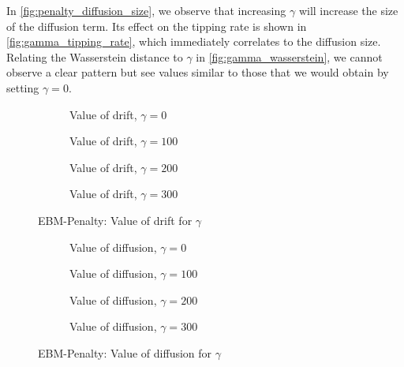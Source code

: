 \documentclass[twoside,11pt]{article}
\begin{document}
In \cref{fig:penalty_diffusion_size}, we observe that increasing \(\gamma\) will increase the size of the diffusion term. Its effect on the tipping rate is shown in \cref{fig:gamma_tipping_rate}, which immediately correlates to the diffusion size. Relating the Wasserstein distance to \(\gamma\) in \cref{fig:gamma_wasserstein}, we cannot observe a clear pattern but see values similar to those that we would obtain by setting \(\gamma=0\).

\begin{figure}
    \begin{subfigure}{.5\textwidth}
        \centering
        
        \caption{Value of drift, \(\gamma=0\)}
    \end{subfigure}
    \begin{subfigure}{.5\textwidth}
        \centering
        
        \caption{Value of drift, \(\gamma=100\)}
    \end{subfigure}
    \begin{subfigure}{.5\textwidth}
        \centering
        
        \caption{Value of drift, \(\gamma=200\)}
    \end{subfigure}
    \begin{subfigure}{.5\textwidth}
        \centering
        
        \caption{Value of drift, \(\gamma=300\)}
    \end{subfigure}
    \caption{EBM-Penalty: Value of drift for \(\gamma\)}
    \label{fig:value_of_drift_gamma}
\end{figure}

\begin{figure}
    \begin{subfigure}{.5\textwidth}
        \centering
        
        \caption{Value of diffusion, \(\gamma=0\)}
    \end{subfigure}
    \begin{subfigure}{.5\textwidth}
        \centering
        
        \caption{Value of diffusion, \(\gamma=100\)}
    \end{subfigure}
    \begin{subfigure}{.5\textwidth}
        \centering
        
        \caption{Value of diffusion, \(\gamma=200\)}
    \end{subfigure}
    \begin{subfigure}{.5\textwidth}
        \centering
        
        \caption{Value of diffusion, \(\gamma=300\)}
    \end{subfigure}
    \caption{EBM-Penalty: Value of diffusion for \(\gamma\)}
    \label{fig:value_of_diffusion_gamma}
\end{figure}
\end{document}
